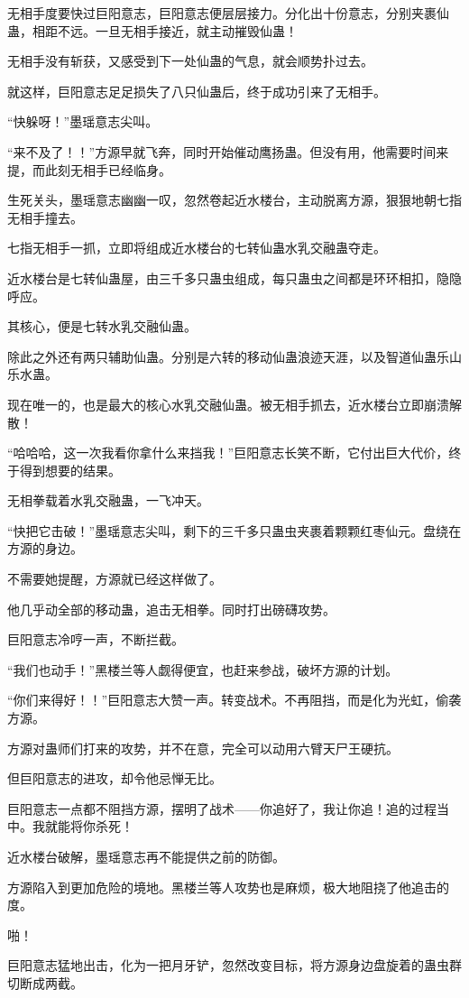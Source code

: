\begin{this_body}
无相手度要快过巨阳意志，巨阳意志便层层接力。分化出十份意志，分别夹裹仙蛊，相距不远。一旦无相手接近，就主动摧毁仙蛊！

无相手没有斩获，又感受到下一处仙蛊的气息，就会顺势扑过去。

就这样，巨阳意志足足损失了八只仙蛊后，终于成功引来了无相手。

“快躲呀！”墨瑶意志尖叫。

“来不及了！！”方源早就飞奔，同时开始催动鹰扬蛊。但没有用，他需要时间来提，而此刻无相手已经临身。

生死关头，墨瑶意志幽幽一叹，忽然卷起近水楼台，主动脱离方源，狠狠地朝七指无相手撞去。

七指无相手一抓，立即将组成近水楼台的七转仙蛊水乳交融蛊夺走。

近水楼台是七转仙蛊屋，由三千多只蛊虫组成，每只蛊虫之间都是环环相扣，隐隐呼应。

其核心，便是七转水乳交融仙蛊。

除此之外还有两只辅助仙蛊。分别是六转的移动仙蛊浪迹天涯，以及智道仙蛊乐山乐水蛊。

现在唯一的，也是最大的核心水乳交融仙蛊。被无相手抓去，近水楼台立即崩溃解散！

“哈哈哈，这一次我看你拿什么来挡我！”巨阳意志长笑不断，它付出巨大代价，终于得到想要的结果。

无相拳载着水乳交融蛊，一飞冲天。

“快把它击破！”墨瑶意志尖叫，剩下的三千多只蛊虫夹裹着颗颗红枣仙元。盘绕在方源的身边。

不需要她提醒，方源就已经这样做了。

他几乎动全部的移动蛊，追击无相拳。同时打出磅礴攻势。

巨阳意志冷哼一声，不断拦截。

“我们也动手！”黑楼兰等人觑得便宜，也赶来参战，破坏方源的计划。

“你们来得好！！”巨阳意志大赞一声。转变战术。不再阻挡，而是化为光虹，偷袭方源。

方源对蛊师们打来的攻势，并不在意，完全可以动用六臂天尸王硬抗。

但巨阳意志的进攻，却令他忌惮无比。

巨阳意志一点都不阻挡方源，摆明了战术——你追好了，我让你追！追的过程当中。我就能将你杀死！

近水楼台破解，墨瑶意志再不能提供之前的防御。

方源陷入到更加危险的境地。黑楼兰等人攻势也是麻烦，极大地阻挠了他追击的度。

啪！

巨阳意志猛地出击，化为一把月牙铲，忽然改变目标，将方源身边盘旋着的蛊虫群切断成两截。


\end{this_body}
